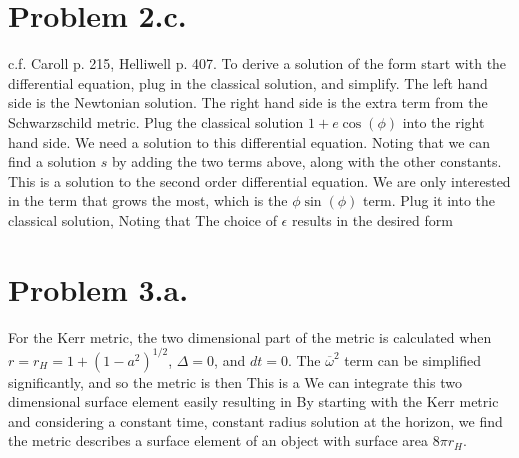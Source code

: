 \documentclass{article}
\begin{document}
\section*{Problem 2.c.}
c.f. Caroll p. 215, Helliwell p. 407. To derive a solution of the form
start with the differential equation, plug in the classical solution, and simplify.
The left hand side is the Newtonian solution. The right hand side is the extra term from the Schwarzschild metric. Plug the classical solution $1+e\cos(\phi)$ into the right hand side.
We need a solution to this differential equation. Noting that
we can find a solution $s$ by adding the two terms above, along with the other constants.
This is a solution to the second order differential equation. We are only interested in the term that grows the most, which is the $\phi\sin(\phi)$ term. Plug it into the classical solution,
Noting that
The choice of $\epsilon$ 
results in the desired form
\section*{Problem 3.a.}
For the Kerr metric, the two dimensional part of the metric is calculated when $r=r_H=1+(1-a^2)^{1/2}$, $\Delta=0$, and $dt=0$. 
The $\overline{\omega}^2$ term can be simplified significantly,
and so the metric is then
This is a  We can integrate this two dimensional surface element easily resulting in 
By starting with the Kerr metric and considering a constant time, constant radius solution at the horizon, we find the metric describes a surface element of an object with surface area $8\pi r_H$.
\end{document}
